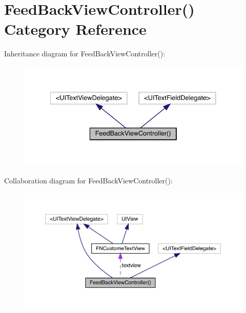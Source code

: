 \hypertarget{category_feed_back_view_controller_07_08}{}\section{Feed\+Back\+View\+Controller() Category Reference}
\label{category_feed_back_view_controller_07_08}


Inheritance diagram for Feed\+Back\+View\+Controller()\+:\nopagebreak
\begin{figure}[H]
\begin{center}
\leavevmode
\includegraphics[width=334pt]{category_feed_back_view_controller_07_08__inherit__graph}
\end{center}
\end{figure}


Collaboration diagram for Feed\+Back\+View\+Controller()\+:\nopagebreak
\begin{figure}[H]
\begin{center}
\leavevmode
\includegraphics[width=350pt]{category_feed_back_view_controller_07_08__coll__graph}
\end{center}
\end{figure}
